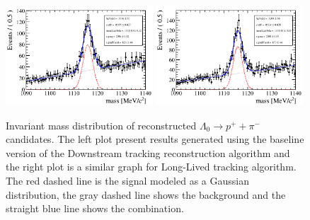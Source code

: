 \begin{figure}[tbph]
\begin{center}
\includegraphics[width = 0.49\textwidth]{figures/tracking_ks/mass_lambda_baseline.png} 
\includegraphics[width = 0.49\textwidth]{figures/tracking_ks/mass_lambda_bdt.png}
\caption{Invariant mass distribution of reconstructed $\Lambda_0 \rightarrow p^{+} + \pi^{-}$ candidates.  The left plot present results generated using the baseline version of the Downstream tracking reconstruction algorithm and the right plot is a  similar graph for Long-Lived tracking algorithm. The red  dashed line is the signal modeled as a Gaussian distribution, the gray dashed line shows the background and the straight blue line shows the combination.}
\label{fig:Lambda_performance}
 \end{center}
 \end{figure}

